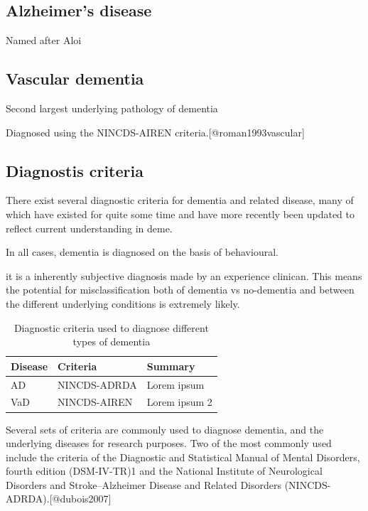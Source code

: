 \documentclass[a4paper,nobind]{templates/ociamthesis}
\begin{document}
\hypertarget{alzheimers-disease}{%
\subsection{Alzheimer's disease}\label{alzheimers-disease}}

Named after Aloi

\hypertarget{vascular-dementia}{%
\subsection{Vascular dementia}\label{vascular-dementia}}

Second largest underlying pathology of dementia

Diagnosed using the NINCDS-AIREN criteria.{[}@roman1993vascular{]}

\hypertarget{diagnostis-criteria}{%
\subsection{Diagnostis criteria}\label{diagnostis-criteria}}

There exist several diagnostic criteria for dementia and related disease, many of which have existed for quite some time and have more recently been updated to reflect current understanding in deme.

In all cases, dementia is diagnosed on the basis of behavioural.

it is a inherently subjective diagnosis made by an experience clinican. This means the potential for misclassification both of dementia vs no-dementia and between the different underlying conditions is extremely likely.

\begin{table}[!h]

\caption{\label{tab:diagnosticCriteria-table}Diagnostic criteria used to diagnose different types of dementia}
\centering
\begin{tabular}[t]{lll}
\toprule
Disease & Criteria & Summary\\
\midrule
AD & NINCDS-ADRDA & Lorem ipsum\\
VaD & NINCDS-AIREN & Lorem ipsum 2\\
\bottomrule
\end{tabular}
\end{table}

Several sets of criteria are commonly used to diagnose dementia, and the underlying diseases for research purposes. Two of the most commonly used include the criteria of the Diagnostic and Statistical Manual of Mental Disorders, fourth edition (DSM-IV-TR)1 and the National Institute of Neurological Disorders and Stroke--Alzheimer Disease and Related Disorders (NINCDS-ADRDA).{[}@dubois2007{]}
\end{document}
